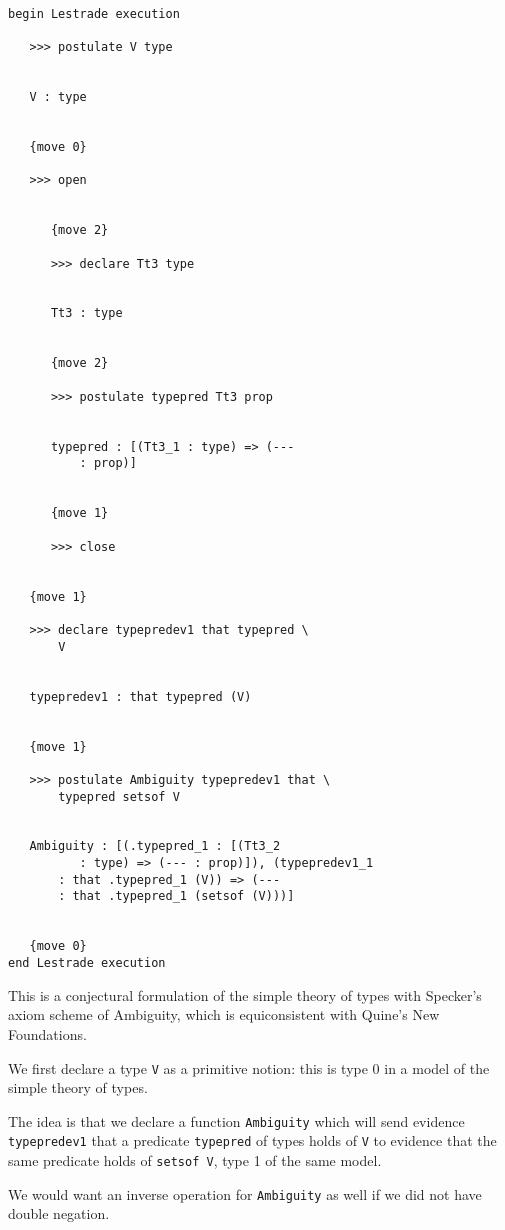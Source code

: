 \documentclass[12pt]{article}
\begin{document}
\begin{verbatim}

begin Lestrade execution

   >>> postulate V type


   V : type


   {move 0}

   >>> open


      {move 2}

      >>> declare Tt3 type


      Tt3 : type


      {move 2}

      >>> postulate typepred Tt3 prop


      typepred : [(Tt3_1 : type) => (--- 
          : prop)]


      {move 1}

      >>> close


   {move 1}

   >>> declare typepredev1 that typepred \
       V


   typepredev1 : that typepred (V)


   {move 1}

   >>> postulate Ambiguity typepredev1 that \
       typepred setsof V


   Ambiguity : [(.typepred_1 : [(Tt3_2 
          : type) => (--- : prop)]), (typepredev1_1 
       : that .typepred_1 (V)) => (--- 
       : that .typepred_1 (setsof (V)))]


   {move 0}
end Lestrade execution
\end{verbatim}

This is a conjectural formulation of the simple theory of types with Specker's axiom scheme of Ambiguity, which is equiconsistent with Quine's New Foundations.



We first declare a type {\tt V} as a primitive notion:  this is type 0 in a model of the simple theory of types.

The idea is that we declare a function {\tt Ambiguity} which will send evidence {\tt typepredev1} that a predicate {\tt typepred} of types holds of {\tt V}
to evidence that the same predicate holds of {\tt setsof V}, type 1 of the same model.  

We would want an inverse operation for {\tt Ambiguity} as well if we did not have double negation.
\end{document}

